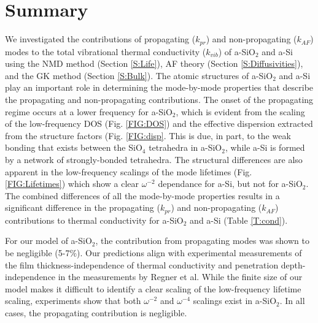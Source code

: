\documentclass[aps,prb,onecolumn,preprint,superscriptaddress,footinbib,amsmath,amssymb,floatfix]{revtex4}
\begin{document}
\section{\label{S:Lifetimes}Summary}

We investigated the contributions of propagating ($k_{pr}$) 
and non-propagating ($k_{AF}$) modes to the total vibrational 
thermal conductivity ($k_{vib}$) of 
a-SiO$_2$ and a-Si using the NMD method (Section \ref{S:Life}),  
AF theory (Section \ref{S:Diffusivities}), and 
the GK method (Section \ref{S:Bulk}). 
The atomic structures of a-SiO$_2$ and a-Si play an important role 
in determining the mode-by-mode properties that describe the 
propagating and non-propagating contributions. The onset of the 
propagating regime occurs at a lower frequency for a-SiO$_2$, which is 
evident from the scaling of the low-frequency DOS (Fig. \ref{FIG:DOS}) 
and the effective dispersion extracted from the structure factors 
(Fig. \ref{FIG:disp}. This is due, in part, 
to the weak bonding that exists between the SiO$_4$ 
tetrahedra in a-SiO$_2$,
\cite{van_Beest_force_1990,kramer_interatomic_1991,
guissani_numerical_1996,mcgaughey_thermal_2004} 
while a-Si is formed by a network 
of strongly-bonded tetrahedra.
\cite{stillinger_computer_1985,biswas_vibrational_1988,
allen_diffusons_1999,barkema_high-quality_2000} 
The structural differences are also 
apparent in the low-frequency scalings of the mode lifetimes (Fig. 
\ref{FIG:Lifetimes}) which show a clear $\omega^{-2}$ dependance 
for a-Si, but not for a-SiO$_2$. The combined differences of all the 
mode-by-mode properties results in a significant difference 
in the propagating ($k_{pr}$) and non-propagating ($k_{AF}$) contributions 
to thermal conductivity for a-SiO$_2$ and a-Si (Table \ref{T:cond}). 

For our model of a-SiO$_2$, the contribution from propagating modes 
was shown to be negligible (5-7$\%$). 
Our predictions align with experimental measurements of the film 
thickness-independence of thermal conductivity 
\cite{lee_heat_1997,yamane_measurement_2002} 
and penetration depth-independence in the measurements  
by Regner et al.\cite{regner_broadband_2013}
While the finite size 
of our model makes it difficult to identify a clear scaling 
of the low-frequency lifetime scaling, experiments show that 
both $\omega^{-2}$ and $\omega^{-4}$ scalings exist in 
a-SiO$_2$.\cite{masciovecchio_evidence_2006,baldi_sound_2010,
baldi_emergence_2013} In all cases, the propagating contribution 
is negligible.\cite{love_estimate_1990,lee_heat_1997,
yamane_measurement_2002,baldi_thermal_2008}
\end{document}
